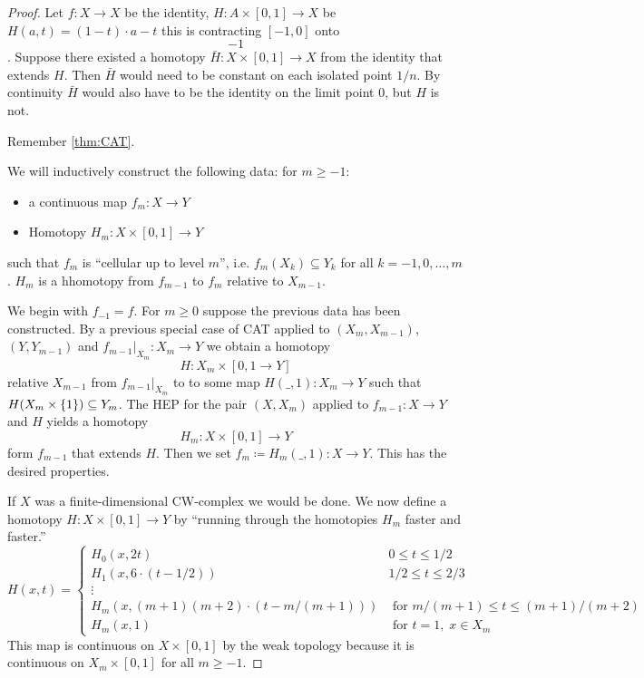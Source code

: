 \documentclass{TemplateLecture}
\begin{document}
\begin{proof}
    Let \(f\colon X \to X\) be the identity, \(H\colon A \times [0,1] \to X \) be \(H(a,t) = (1-t) \cdot a - t\) this is contracting \([-1,0]\) onto \[-1\]. Suppose there existed a homotopy \(\bar H \colon X \times [0,1] \to X\) from the identity that extends \(H\). Then \(\bar H\) would need to be constant on each isolated point \(1/n\). By continuity \(\bar H\) would also have to be the identity on the limit point \(0\), but \(H\) is not.

    Remember \ref{thm:CAT}.

    We will inductively construct the following data: for \(m \geq -1\):
    \begin{itemize}
        \item a continuous map \(f_m \colon X \to Y\)
        \item Homotopy \(H_m \colon X \times [0, 1] \to Y\)
    \end{itemize}
    such that \(f_m\) is \enquote{cellular up to level \(m\)}, i.e. \(f_m(X_k) \subseteq Y_k\) for all \(k = -1, 0, \dots, m\).
    \(H_m\) is a hhomotopy from \(f_{m-1}\) to \(f_m\) relative to \(X_{m-1}\).

    We begin with \(f_{-1} = f\). For \(m \geq 0\) suppose the previous data has been constructed. By a previous special case of CAT applied to \((X_m, X_{m-1})\), \((Y, Y_{m-1})\) and \(f_{m-1}\rvert_{X_m} \colon X_m \to Y\) we obtain a homotopy
    \[H\colon X_m \times [0,1 \to Y]\]
    relative \(X_{m-1}\) from \(f_{m-1} \rvert_{X_m}\) to to some map \(H(\_, 1)\colon X_m \to Y\) such that \(H(X_m \times \{1\}) \subseteq Y_m\). The HEP for the pair \((X, X_m)\) applied to \(f_{m-1} \colon X \to Y\) and \(H\) yields a homotopy
    \[H_m \colon X \times [0,1] \to Y\]
    form \(f_{m-1}\) that extends \(H\). Then we set \(f_m \coloneq H_m(\_,1)\colon X \to Y\). This has the desired properties.

    If \(X\) was a finite-dimensional CW-complex we would be done.
    We now define a homotopy \(H\colon X \times [0,1] \to Y\) by \enquote{running through the homotopies \(H_m\) faster and faster.}
    \[H(x,t) = \begin{cases}
        H_0(x, 2t) & 0 \leq t \leq 1/2 \\
        H_1(x, 6 \cdot (t - 1/2)) & 1/2 \leq t \leq 2/3 \\
        \vdots & \\
        H_m(x, (m+1)(m+2) \cdot (t - m/(m+1))) & \text{ for } m/(m+1) \leq t \leq (m+1)/(m+2) \\
        H_m(x,1) & \text{ for } t = 1, \;x \in X_m
    \end{cases}\]
    This map is continuous on \(X \times [0,1]\) by the weak topology because it is continuous on \(X_m \times [0,1]\) for all \(m \geq -1\).
\end{proof}
\end{document}
